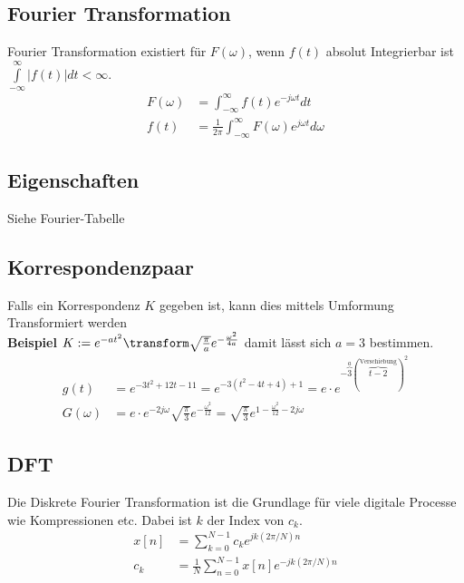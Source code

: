 \subsection{Fourier Transformation}
Fourier Transformation existiert für $F(\omega)$, wenn $f(t)$ absolut Integrierbar ist $\int\limits_{-\infty}^{\infty}|f(t)|dt < \infty$.
\begin{align*}
	F(\omega) &= \int_{-\infty}^{\infty}f(t)e^{-j \omega t}dt \\
	f(t) &= \frac{1}{2\pi}\int_{-\infty}^{\infty}F(\omega)e^{j \omega t}d\omega
\end{align*}

\subsection{Eigenschaften}
Siehe Fourier-Tabelle

\subsection{Korrespondenzpaar}
Falls ein Korrespondenz $K$ gegeben ist, kann dies mittels Umformung Transformiert werden\\
\noindent\textbf{Beispiel} $K := e^{-at^2} \transform \sqrt{\frac{\pi}{a}}e^{-\frac{\omega^2}{4a}}$ damit lässt sich $a = 3$ bestimmen. 
\begin{align*}
	g(t) &= e^{-3t^2 + 12t - 11} = e^{-3(t^2 -4t + 4) + 1} = e\cdot e^{-\overbrace{3}^{a}(\overbrace{t-2}^{\text{Verschiebung}})^2}\\
	G(\omega) &= e\cdot e^{-2j\omega}\sqrt{\frac{\pi}{3}}e^{-\frac{\omega^2}{12}} = \sqrt{\frac{\pi}{3}}e^{1-\frac{\omega^2}{12}-2j\omega}
\end{align*}

\subsection{DFT}
Die Diskrete Fourier Transformation ist die Grundlage für viele digitale Processe wie Kompressionen etc. Dabei ist $k$ der Index von $c_k$.
\begin{align*}
	x[n] &= \sum_{k=0}^{N-1}c_k e^{jk(2\pi/N)n}  \\
	c_k &= \frac{1}{N}\sum_{n=0}^{N-1}x[n]e^{-jk(2\pi/N)n}
\end{align*}


